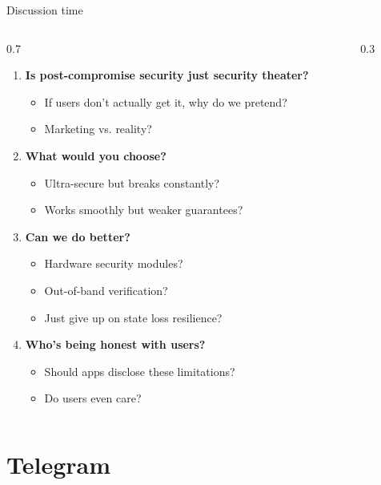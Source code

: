 \ifdefined\PRESENTATION\else\PassOptionsToClass{handout}{beamer}\fi\documentclass[aspectratio=169, lualatex]{beamer}
\begin{document}
\begin{frame}{Discussion time}
	\begin{columns}[c]
		\begin{column}{0.7\textwidth}
			\begin{enumerate}
				\item \textbf{Is post-compromise security just security theater?}
				      \begin{itemize}
					      \item If users don't actually get it, why do we pretend?
					      \item Marketing vs. reality?
				      \end{itemize}
				\item \textbf{What would you choose?}
				      \begin{itemize}
					      \item Ultra-secure but breaks constantly?
					      \item Works smoothly but weaker guarantees?
				      \end{itemize}
				\item \textbf{Can we do better?}
				      \begin{itemize}
					      \item Hardware security modules?
					      \item Out-of-band verification?
					      \item Just give up on state loss resilience?
				      \end{itemize}
				\item \textbf{Who's being honest with users?}
				      \begin{itemize}
					      \item Should apps disclose these limitations?
					      \item Do users even care?
				      \end{itemize}
			\end{enumerate}
		\end{column}
		\begin{column}{0.3\textwidth}
		\end{column}
	\end{columns}
\end{frame}

\section{Telegram}
\end{document}
